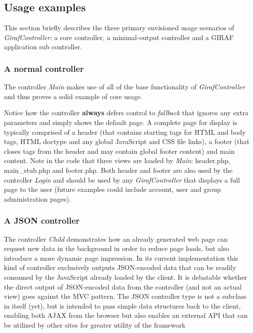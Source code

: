 \subsection{Usage examples}
This section briefly describes the three primary envisioned usage scenarios of \emph{GirafController}: a core controller, a minimal-output controller and a GIRAF application sub controller.

\subsubsection*{A normal controller}
The controller \emph{Main} makes use of all of the base functionality of \emph{GirafController} and thus proves a solid example of core usage.



Notice how the controller \textbf{always} defers control to \emph{fallback} that ignores any extra parameters and simply shows the default page. A complete page for display is typically comprised of a header (that contains starting tags for HTML and body tags, HTML doctype and any global JavaScript and CSS file links), a footer (that closes tags from the header and may contain global footer content) and main content. Note in the code that three views are loaded by \emph{Main}: header.php, main\_stub.php and footer.php. Both header and footer are also used by the controller \emph{Login} and should be used by any \emph{GirafController} that displays a full page to the user (future examples could include account, user and group administration pages).

\subsubsection*{A JSON controller}


The controller \emph{Child} demonstrates how an already generated web page can request new data in the background in order to reduce page loads, but also introduce a more dynamic page impression. In its current implementation this kind of controller exclusively outputs JSON-encoded data that can be readily consumed by the JavaScript already loaded by the client. It is debatable whether the direct output of JSON-encoded data from the controller (and not an actual view) goes against the MVC pattern.
The JSON controller type is not a subclass in itself (yet), but is intended to pass simple data structures back to the client, enabling both AJAX from the browser but also enables an external API that can be utilized by other sites for greater utility of the framework
\newline

